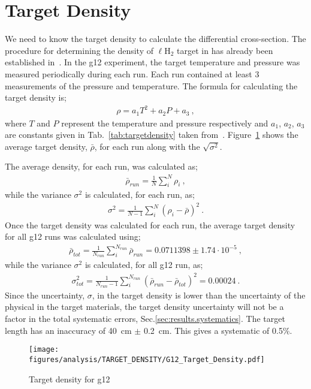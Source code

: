 \section{Target Density}\label{sec:analysis.target_density}

We need to know the target density to calculate the differential cross-section. The procedure for determining the density of $\ell$H$_2$ target in  has already been established in~\cite{clas.target.density}. In the g12 experiment, the target temperature and pressure was measured periodically during each run. Each run contained at least 3 measurements of the pressure and temperature. The formula for calculating the target density is;
\begin{align}
\rho = a_1T^2 + a_2P +a_3 \label{eq:target_density} \ ,
\end{align} 
where $T$ and $P$ represent the temperature and pressure respectively and $a_1$, $a_2$, $a_3$ are constants given in Tab.~\ref{tab:targetdensity} taken from~\cite{mccarty}. Figure~\ref{fig:target_density} shows the average target density, $\bar \rho$, for each run along with the $\sqrt{\sigma^2}$.

The average density, for each run, was calculated as;
\begin{align}
\bar \rho_{run} = \frac{1}{N}\sum_i^N \rho_i \ ,
\end{align} 
while the variance $\sigma^2$ is calculated, for each run, as;
\begin{align}
\sigma^2 = \frac{1}{N - 1}\sum_i^N (\rho_i - \bar \rho)^2 \ .
\end{align}
Once the target density was calculated for each run, the average target density for all g12 runs was calculated using;
\begin{align}
\bar \rho_{tot} = \frac{1}{N_{run}}\sum_i^{N_{run}} \bar \rho_{run} = 0.0711398 \pm 1.74 \cdot10^{-5}\ ,
\end{align} 
while the variance $\sigma^2$ is calculated, for all g12 run, as;
\begin{align}
\sigma_{tot}^2 = \frac{1}{N_{run} -1}\sum_i^{N_{run}} (\bar \rho_{run} - \bar \rho_{tot})^2 = 0.00024 \ .
\end{align}
Since the uncertainty, $\sigma$, in the target density is lower than the uncertainty of the physical in the target materials, the target density uncertainty will not be a factor in the total systematic errors, Sec.\ref{sec:results.systematics}. The target length has an inaccuracy of 40~cm $\pm$ 0.2~cm. This gives a systematic of 0.5\%. 

\begin{figure}[h!]\begin{center}
\texttt{[image: \\figures/analysis/TARGET\_DENSITY/G12\_Target\_Density.pdf]}
\caption[Target density for g12]{\label{fig:target_density}Target density for g12}
\end{center}\end{figure}
\FloatBarrier